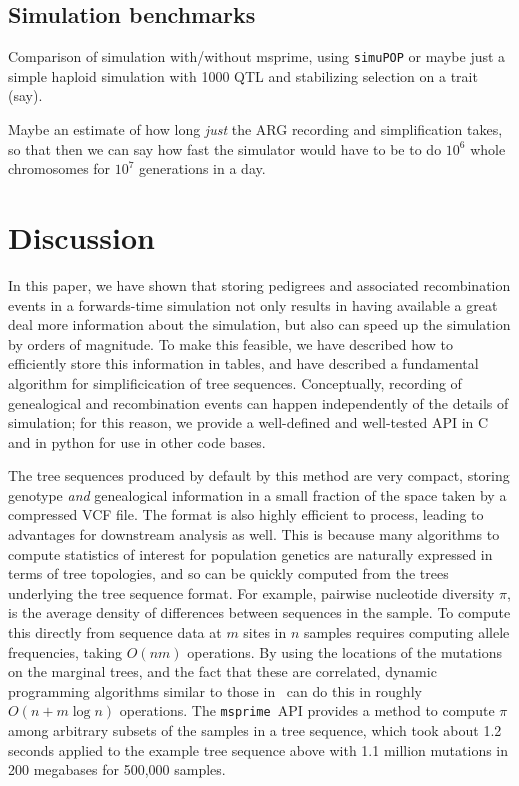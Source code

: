 \documentclass{article}
\newcommand{\simupop}{\texttt{simuPOP}}
\newcommand{\msprime}{\texttt{msprime}}
\begin{document}
\subsection*{Simulation benchmarks}

Comparison of simulation with/without msprime, using \simupop{}
or maybe just a simple haploid simulation with 1000 QTL and stabilizing selection on a trait (say).

Maybe an estimate of how long \emph{just} the ARG recording and simplification takes,
so that then we can say how fast the simulator would have to be to do $10^6$ whole chromosomes for $10^7$ generations
in a day.


\section*{Discussion}

In this paper, we have shown that storing pedigrees
and associated recombination events
in a forwards-time simulation
not only results in having available a great deal more information about the simulation,
but also can speed up the simulation by orders of magnitude.
To make this feasible, 
we have described how to efficiently store this information in tables,
and have described a fundamental algorithm for simplificication of tree sequences.
Conceptually, recording of genealogical and recombination events
can happen independently of the details of simulation;
for this reason, we provide a well-defined and well-tested API in C and in python
for use in other code bases.

The tree sequences produced by default by this method
are very compact, storing genotype \emph{and} genealogical information
in a small fraction of the space taken by a compressed VCF file.
The format is also highly efficient to process,
leading to advantages for downstream analysis as well.
This is because many algorithms to compute statistics of interest for population genetics
are naturally expressed in terms of tree topologies,
and so can be quickly computed from the trees underlying the tree sequence format. 
For example, pairwise nucleotide diversity $\pi$, is the average density of
differences between sequences in the sample. 
To compute this directly from sequence data at $m$ sites in $n$ samples
requires computing allele frequencies, taking $O(nm)$ operations.
By using the locations of the mutations on the marginal trees,
and the fact that these are correlated, 
dynamic programming algorithms similar to those in~\citep{kelleher2016efficient}
can do this in roughly $O(n + m \log n)$ operations.
The \msprime\ API provides a method to compute $\pi$ among arbitrary subsets of the
samples in a tree sequence, which took about 1.2 seconds
applied to the example tree sequence above with 1.1 million mutations 
in 200 megabases for 500,000 samples.
\end{document}
